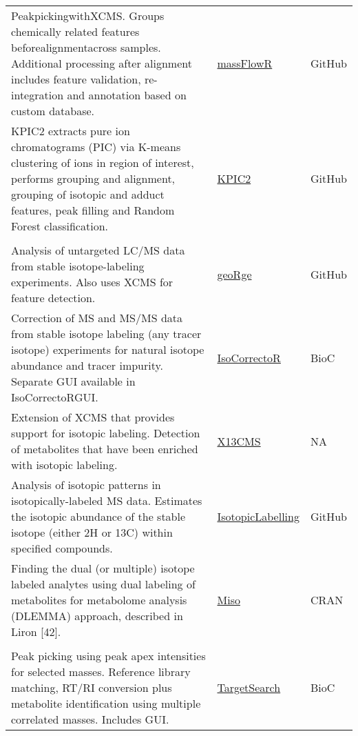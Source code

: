 \documentclass[]{article}
\begin{document}
\begin{longtable}{>{\raggedright\arraybackslash}p{30em}>{\raggedright\arraybackslash}p{10em}>{\raggedright\arraybackslash}p{3em}}
PeakpickingwithXCMS. Groups chemically related features beforealignmentacross samples. Additional processing after alignment includes feature validation, re-integration and annotation based on custom database. & \href{https://github.com/lauzikaite/massFlowR}{massFlowR} & GitHub\\
\rowcolor{gray!6}  KPIC2 extracts pure ion chromatograms (PIC) via K-means clustering of ions in region of interest, performs grouping and alignment, grouping of isotopic and adduct features, peak filling and Random Forest classification. & \href{https://github.com/hcji/KPIC2}{KPIC2} & GitHub\\
\addlinespace[0.3em]
\multicolumn{3}{l}{\textbf{Isotope labeling using MS}}\\
Analysis of untargeted LC/MS data from stable isotope-labeling experiments. Also uses XCMS for feature detection. & \href{https://github.com/jcapelladesto/geoRge}{geoRge} & GitHub\\
\rowcolor{gray!6}  Correction of MS and MS/MS data from stable isotope labeling (any tracer isotope) experiments for natural isotope abundance and tracer impurity. Separate GUI available in IsoCorrectoRGUI. & \href{https://bioconductor.org/packages/release/bioc/html/IsoCorrectoR.html}{IsoCorrectoR} & BioC\\
Extension of XCMS that provides support for isotopic labeling. Detection of metabolites that have been enriched with isotopic labeling. & \href{http://pattilab.wustl.edu/software/x13cms/x13cms.php}{X13CMS} & NA\\
\rowcolor{gray!6}  Analysis of isotopic patterns in isotopically-labeled MS data. Estimates the isotopic abundance of the stable isotope (either 2H or 13C) within specified compounds. & \href{https://github.com/RuggeroFerrazza/IsotopicLabelling}{IsotopicLabelling} & GitHub\\
Finding the dual (or multiple) isotope labeled analytes using dual labeling of metabolites for metabolome analysis (DLEMMA) approach, described in Liron [42]. & \href{https://cran.r-project.org/web/packages/Miso}{Miso} & CRAN\\
\rowcolor{gray!6}  \addlinespace[0.3em]
\multicolumn{3}{l}{\textbf{Targeted MS}}\\
Peak picking using peak apex intensities for selected masses. Reference library matching, RT/RI conversion plus metabolite identification using multiple correlated masses. Includes GUI. & \href{http://bioconductor.org/packages/2.5/bioc/html/TargetSearch.html}{TargetSearch} & BioC\\

\end{longtable}
\end{document}
